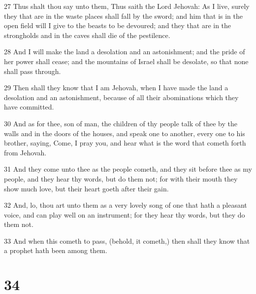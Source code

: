 \par 27 Thus shalt thou say unto them, Thus saith the Lord Jehovah: As I live, surely they that are in the waste places shall fall by the sword; and him that is in the open field will I give to the beasts to be devoured; and they that are in the strongholds and in the caves shall die of the pestilence.
\par 28 And I will make the land a desolation and an astonishment; and the pride of her power shall cease; and the mountains of Israel shall be desolate, so that none shall pass through.
\par 29 Then shall they know that I am Jehovah, when I have made the land a desolation and an astonishment, because of all their abominations which they have committed.
\par 30 And as for thee, son of man, the children of thy people talk of thee by the walls and in the doors of the houses, and speak one to another, every one to his brother, saying, Come, I pray you, and hear what is the word that cometh forth from Jehovah.
\par 31 And they come unto thee as the people cometh, and they sit before thee as my people, and they hear thy words, but do them not; for with their mouth they show much love, but their heart goeth after their gain.
\par 32 And, lo, thou art unto them as a very lovely song of one that hath a pleasant voice, and can play well on an instrument; for they hear thy words, but they do them not.
\par 33 And when this cometh to pass, (behold, it cometh,) then shall they know that a prophet hath been among them.

\chapter{34}

